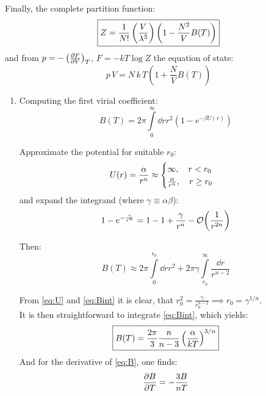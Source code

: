 \documentclass[11pt,a4paper]{scrartcl}
\newcommand{\thermpart}[3]{\left(\pdv{#1}{#2}\right)_{#3}}
\begin{document}
Finally, the complete partition function:
\begin{equation}
    \boxed{%
    Z=\frac{1}{N!}\left(\frac{V}{\lambda^3}\right)\left(1-\frac{N^2}{V}B(T)\right)}
    \label{eq:Z}
\end{equation}
and from $p=-\thermpart{F}{V}{T}$, $F=-kT\log{Z}$ the equation of state:
\begin{equation}
    \boxed{p\,V=N\,k\,T\left(1+\frac{N}{V}B(T)\right)}
    \label{eq:EOS}
\end{equation}


\begin{enumerate}[label=\textbf{\large(\alph*)}, itemsep=2\baselineskip]

\item
    Computing the first virial coefficient:
    \begin{equation*}
        B(T)=2\pi\int\limits_{0}^{\infty}\dd{r}r^2\left(1-e^{-\beta{U}(r)}\right)
    \end{equation*}

    Approximate the potential for suitable $r_0$:
    \begin{equation}
        U(r)=\frac{\alpha}{r^n}\approx
        \begin{cases}
            \infty\qc r<r_0 \\
            \frac{\alpha}{r^n}\qc r\geq r_0
        \end{cases}
        \label{eq:U}
    \end{equation}
    and expand the integrand (where $\gamma\equiv\alpha\beta$):
    \begin{equation*}
        1-e^{-\frac{\gamma}{r^n}}=1-1+\frac{\gamma}{r^n}-\order{\frac{1}{r^{2n}}}
    \end{equation*}

    Then:
    \begin{equation}
        B(T)\approx
        2\pi\int\limits_{0}^{r_0}\dd{r}r^2+2\pi\gamma\int\limits_{r_0}^{\infty}\frac{\dd{r}}{r^{n-2}}
        \label{eq:Bint}
    \end{equation}

    From \eqref{eq:U} and \eqref{eq:Bint} it is clear, that
    $r_0^2=\frac{\gamma}{r_{0}^{n-2}}\implies r_0=\gamma^{1/n}$. \\
    It is then straightforward to integrate \eqref{eq:Bint}, which yields:
    \begin{equation}
        \boxed{%
        B(T)=\frac{2\pi}{3}\frac{n}{n-3}\left(\frac{\alpha}{kT}\right)^{3/n}}
        \label{eq:B}
    \end{equation}
    And for the derivative of \eqref{eq:B}, one finds:
    \begin{equation*}
        \pdv{B}{T}=-\frac{3B}{nT}
    \end{equation*}



\end{enumerate}
\end{document}
